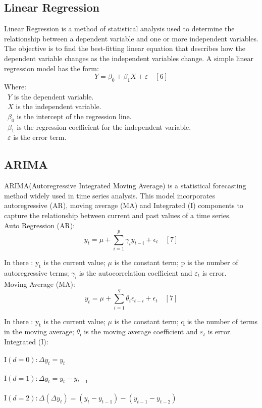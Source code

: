 \documentclass{ieeeojies}
\begin{document}
\subsection{Linear Regression}
Linear Regression is a method of statistical analysis used to determine the relationship between a dependent variable and one or more independent variables. The objective is to find the best-fitting linear equation that describes how the dependent variable changes as the independent variables change.
A simple linear regression model has the form: 
\[Y=\beta_0+\beta_1X+\varepsilon \quad[6]\]
Where:\\
	\indent\textbullet\ \(Y\) is the dependent variable.\\
	\indent\textbullet\ \(X\) is the independent variable.\\
	\indent\textbullet\ \(\beta_0\) is the intercept of the regression line.\\
	\indent\textbullet\ \(\beta_1\) is the regression coefficient for the independent variable.\\
	\indent\textbullet\ \(\varepsilon\) is the error term.
 \subsection{ARIMA}
 ARIMA(Autoregressive Integrated Moving Average) is a statistical forecasting method widely used in time series analysis. This model incorporates autoregressive (AR), moving average (MA) and Integrated (I) components to capture the relationship between current and past values of a time series.\\
Auto Regression (AR): 
$$
y_t=\mu+\sum_{i=1}^p \gamma_i y_{t-i}+\epsilon_t \quad [7]
$$

In there : $\mathrm{y}_{\mathrm{t}}$ is the current value; $\mu$ is the constant term; $\mathrm{p}$ is the number of autoregressive terms; $\gamma_{\mathrm{i}}$ is the autocorrelation coefficient and $\varepsilon_{t}$ is error.\\
Moving Average (MA):
$$
y_t=\mu+\sum_{i=1}^q \theta_i \epsilon_{t-i}+\epsilon_t \quad [7]
$$

In there : $\mathrm{y}_{\mathrm{t}}$ is the current value; $\mu$ is the constant term; $\mathrm{q}$ is the number of terms in the moving average; $\theta_{\mathrm{i}}$ is the moving average coefficient  and $\varepsilon_{t}$ is error.\\
Integrated (I):\\
 \\$\mathrm{I}(d=0): \Delta y_t=y_t$\\
 \\$\mathrm{I}(d=1): \Delta y_t=y_t-y_{t-1}$\\
 \\$\mathrm{I}(d=2): \Delta\left(\Delta y_t\right)=\left(y_t-y_{t-1}\right)-\left(y_{t-1}-y_{t-2}\right)$ \\
 
\end{document}
